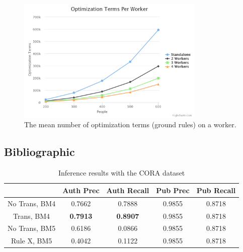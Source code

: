 \documentclass{article}
\begin{document}
            \begin{figure}
                \centering
                \includegraphics[width=0.80\textwidth]{images/optimizationTermsPerWorker.png}
                \caption{The mean number of optimization terms (ground rules) on a worker.}
                \label{fig:distributed-results-terms}
            \end{figure}
    
    \subsection{Bibliographic}
    
        \begin{table}
            \begin{center}
                \begin{tabular}{| c | c | c | c | c |}
                    \hline
                    & Auth Prec & Auth Recall & Pub Prec & Pub Recall \\
                    \hline
                    No Trans, BM4 & 0.7662 & 0.7888 & 0.9855 & 0.8718  \\
                    Trans, BM4    & \textbf{0.7913} & \textbf{0.8907} & 0.9855 & 0.8718  \\
                    No Trans, BM5 & 0.6186 & 0.0866 & 0.9855 & 0.8718  \\
                    Rule X, BM5    & 0.4042 & 0.1122 & 0.9855 & 0.8718  \\
                    \hline
                \end{tabular}
            \caption{Inference results with the CORA dataset}
            \label{tab:corauwash-prec-rec-results}
            \end{center}
        \end{table}        
    
\end{document}
